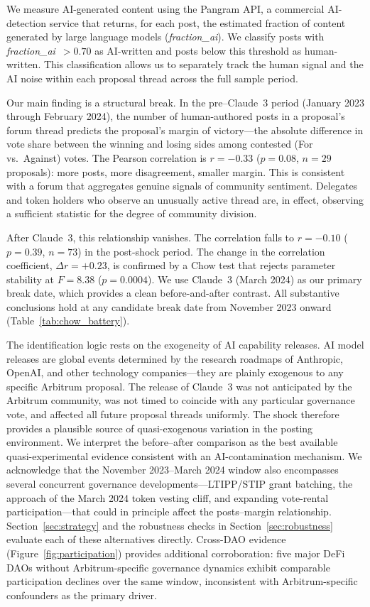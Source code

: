 \documentclass[12pt]{article}
\begin{document}
We measure AI-generated content using the Pangram API, a commercial AI-detection
service that returns, for each post, the estimated fraction of content generated by
large language models (\textit{fraction\_ai}). We classify posts with
\textit{fraction\_ai}~$>0.70$ as AI-written and posts below this threshold as
human-written. This classification allows us to separately track the human signal and
the AI noise within each proposal thread across the full sample period.

Our main finding is a structural break. In the pre--Claude~3
period (January 2023 through February 2024), the number of human-authored posts in a
proposal's forum thread predicts the proposal's margin of
victory---the absolute difference in vote share between the winning and losing
sides among contested (For vs.\ Against) votes. The Pearson correlation is
$r = -0.33$ ($p = 0.08$, $n = 29$ proposals): more posts, more disagreement,
smaller margin. This is consistent with a forum that aggregates genuine signals
of community sentiment. Delegates and token holders who observe an unusually active
thread are, in effect, observing a sufficient statistic for the degree of community
division.

After Claude~3, this relationship vanishes. The correlation falls to $r = -0.10$
($p = 0.39$, $n = 73$) in the post-shock period. The change in the correlation
coefficient, $\Delta r = +0.23$, is confirmed by a
Chow test that rejects parameter stability at $F = 8.38$ ($p = 0.0004$). We use Claude~3 (March 2024) as our primary break date, which provides a clean before-and-after contrast. All substantive conclusions hold at any candidate break date from November 2023 onward (Table~\ref{tab:chow_battery}).

The identification logic rests on the exogeneity of AI capability releases. AI model
releases are global events determined by the research roadmaps of Anthropic, OpenAI,
and other technology companies---they are plainly exogenous to any specific Arbitrum
proposal. The release of Claude~3 was not anticipated by the Arbitrum community, was
not timed to coincide with any particular governance vote, and affected all future
proposal threads uniformly. The shock therefore provides a plausible source of
quasi-exogenous variation in the posting environment. We interpret the before--after
comparison as the best available quasi-experimental evidence consistent with an
AI-contamination mechanism. We acknowledge that the November 2023--March 2024 window
also encompasses several concurrent governance developments---LTIPP/STIP grant batching,
the approach of the March 2024 token vesting cliff, and expanding vote-rental
participation---that could in principle affect the posts--margin relationship.
Section~\ref{sec:strategy} and the robustness checks in Section~\ref{sec:robustness}
evaluate each of these alternatives directly. Cross-DAO evidence
(Figure~\ref{fig:participation}) provides additional corroboration: five major DeFi
DAOs without Arbitrum-specific governance dynamics exhibit comparable participation
declines over the same window, inconsistent with Arbitrum-specific confounders as
the primary driver.
\end{document}
